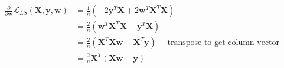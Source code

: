 \newcommand{\matrix}[1]{\mathbf{#1}}
\newcommand{\vector}[1]{\mathbf{#1}}
\newcommand{\X}{\matrix{X}}
\newcommand{\y}{\vector{y}}
\newcommand{\w}{\vector{w}}
\begin{align*}
\frac{\partial}{\partial \w} \mathcal{L}_{LS}(\X,\y,\w) &= \frac{1}{n} \left( -2\y^T\X + 2\w^T\X^T\X \right) \\
&= \frac{2}{n} \left( \w^T\X^T\X - \y^T\X \right) \\
&= \frac{2}{n} \left( \X^T\X\w - \X^T\y \right) \quad \text{ transpose to get column vector} \\
&= \frac{2}{n} \X^T (\X\w - \y) \\
\end{align*}
